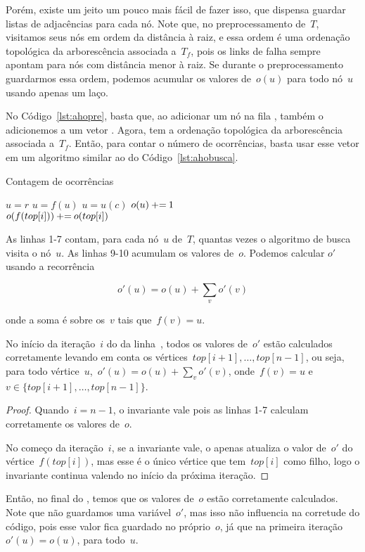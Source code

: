 Porém, existe um jeito um pouco mais fácil de fazer isso, que dispensa guardar listas de adjacências para cada nó. Note que, no preprocessamento de~$T$, visitamos seus nós em ordem da distância à raiz, e essa ordem é uma ordenação topológica da arborescência associada a~$T_f$, pois os links de falha sempre apontam para nós com distância menor à raiz.
Se durante o preprocessamento guardarmos essa ordem, podemos acumular os valores de~$o(u)$ para todo nó~$u$ usando apenas um laço.

No Código~\ref{lst:ahopre}, basta que, ao adicionar um nó na fila , também o adicionemos a um vetor . Agora,  tem a ordenação topológica da arborescência associada a~$T_f$. Então, para contar o número de ocorrências, basta usar esse vetor em um algoritmo similar ao do Código~\ref{lst:ahobusca}.

\begin{algorithm}
\caption{Contagem de ocorrências}
\label{lst:ahocount}
\begin{algorithmic}[1]
\State $u = r$
        \State $u = f(u)$
    \EndWhile
        \State $u = u(c)$
    \EndIf
    \State $o(u)\mathbin{{\tiny +}{=}} 1$
\EndFor
\\ 
 \label{count:for2}
    \State $o(f(top[i])) \mathbin{{\tiny +}{=}} o(top[i])$
\EndFor
\end{algorithmic}
\end{algorithm}

As linhas 1-7 contam, para cada nó~$u$ de~$T$, quantas vezes o algoritmo de busca visita o nó~$u$. As linhas 9-10 acumulam os valores de~$o$. Podemos calcular $o'$ usando a recorrência

$$ o'(u) = o(u) + \sum\limits_{v}{o'(v)} $$

onde a soma é sobre os~$v$ tais que~$f(v) = u$.

\renewcommand{\top}{\mathit{top}}
\begin{invar}
No início da iteração~$i$ do  da linha~, todos os valores de~$o'$ estão calculados corretamente levando em conta os vértices~${\top[i+1], \ldots, \top[n-1]}$, ou seja, para todo vértice~$u$,~${o'(u) = o(u) +  \sum\limits_{v}{o'(v)}}$, onde~$f(v) = u$ e~${v \in \{\top[i + 1], \ldots, \top[n - 1]\}}$.
\end{invar}

\begin{proof}
Quando~$i = n - 1$, o invariante vale pois as linhas 1-7 calculam corretamente os valores de~$o$.

No começo da iteração~$i$, se a invariante vale, o  apenas atualiza o valor de~$o'$ do vértice~$f(\top[i])$, mas esse é o único vértice que tem~$\top[i]$ como filho, logo o invariante continua valendo no início da próxima iteração.
\end{proof}

Então, no final do , temos que os valores de~$o$ estão corretamente calculados. Note que não guardamos uma variável~$o'$, mas isso não influencia na corretude do código, pois esse valor fica guardado no próprio~$o$, já que na primeira iteração~${o'(u) = o(u)}$, para todo~$u$.